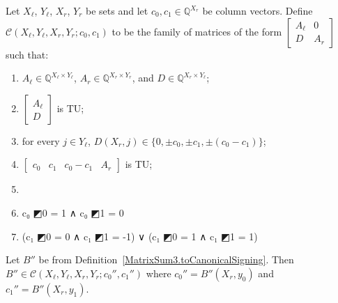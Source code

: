 \begin{definition}
    \label{MatrixLikeSum3}
    \leanok
    Let $X_{\ell}$, $Y_{\ell}$, $X_{r}$, $Y_{r}$ be sets and let $c_{0}, c_{1} \in \mathbb{Q}^{X_{r}}$ be column vectors. Define $\mathcal{C} (X_{\ell}, Y_{\ell}, X_{r}, Y_{r}; c_{0}, c_{1})$ to be the family of matrices of the form $\begin{bmatrix} A_{\ell} & 0 \\ D & A_{r} \end{bmatrix}$ such that:
    \begin{enumerate}
        \item $A_{\ell} \in \mathbb{Q}^{X_{\ell} \times Y_{\ell}}$, $A_{r} \in \mathbb{Q}^{X_{r} \times Y_{r}}$, and $D \in \mathbb{Q}^{X_{r} \times Y_{\ell}}$;
        \item\label{item:mls3_LeftTU} $\begin{bmatrix} A_{\ell} \\ D \end{bmatrix}$ is TU;
        \item\label{item:mls3_Parallels} for every $j \in Y_{\ell}$, $D (X_{r}, j) \in \{0, \pm c_{0}, \pm c_{1}, \pm (c_{0} - c_{1})\}$;
        \item\label{item:mls3_BottomTU} $\begin{bmatrix} c_{0} & c_{1} & c_{0} - c_{1} & A_{r} \end{bmatrix}$ is TU;
        \item\label{item:mls3_AuxTU} 
        \item\label{item:mls3_Col0} c₀ ◩0 = 1 ∧ c₀ ◩1 = 0
        \item\label{item:mls3_Col1} (c₁ ◩0 = 0 ∧ c₁ ◩1 = -1) ∨ (c₁ ◩0 = 1 ∧ c₁ ◩1 = 1)

    \end{enumerate}
\end{definition}

\begin{lemma}
    \label{MatrixSum3.IsCanonicalSigning.toMatrixLikeSum3}
    \leanok
    Let $B''$ be from Definition~\ref{MatrixSum3.toCanonicalSigning}. Then $B'' \in \mathcal{C} (X_{\ell}, Y_{\ell}, X_{r}, Y_{r}; c_{0}'', c_{1}'')$ where $c_{0}'' = B'' (X_{r}, y_{0})$ and $c_{1}'' = B'' (X_{r}, y_{1})$.
\end{lemma}

